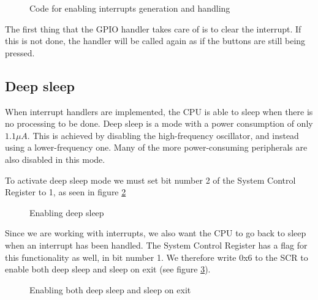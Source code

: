 \begin{figure}[h!]
\caption{Code for enabling interrupts generation and handling}
\label{code:interrupt_setup}
\end{figure}


The first thing that the GPIO handler takes care of is to clear the interrupt. If this is not done, the handler will be called again as if the buttons are still being pressed.

\subsection{Deep sleep}
\label{subsec:dev_pros_deep_sleep}

When interrupt handlers are implemented, the CPU is able to sleep when there is no processing to be done.
Deep sleep is a mode with a power consumption of only $1.1 \mu A$.
This is achieved by disabling the high-frequency oscillator, and instead using a lower-frequency one.
Many of the more power-consuming peripherals are also disabled in this mode.

To activate deep sleep mode we must set bit number 2 of the System Control Register to 1, as seen in figure \ref{code:deep_sleep}

\begin{figure}[h!]
\caption{Enabling deep sleep}
\label{code:deep_sleep}
\end{figure}

Since we are working with interrupts, we also want the CPU to go back to sleep when an interrupt has been handled.
The System Control Register has a flag for this functionality as well, in bit number 1.
We therefore write 0x6 to the SCR to enable both deep sleep and sleep on exit (see figure \ref{code:deep_sleep_on_exit}).

\begin{figure}[h!]
\caption{Enabling both deep sleep and sleep on exit}
\label{code:deep_sleep_on_exit}
\end{figure}
